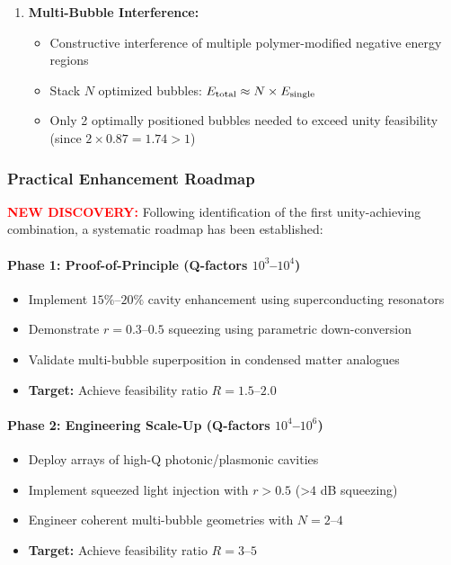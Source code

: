 \documentclass[11pt]{article}
\begin{document}
{\begin{enumerate}
  \item \textbf{Multi-Bubble Interference:}
        \begin{itemize}
          \item Constructive interference of multiple polymer-modified negative energy regions
          \item Stack $N$ optimized bubbles: $E_{\rm total} \approx N \times E_{\rm single}$
          \item Only 2 optimally positioned bubbles needed to exceed unity feasibility (since $2 \times 0.87 = 1.74 > 1$)
        \end{itemize}
\end{enumerate}

\subsubsection*{Practical Enhancement Roadmap}
\textcolor{red}{\textbf{NEW DISCOVERY:}} Following identification of the first unity-achieving combination, a systematic roadmap has been established:

\paragraph{Phase 1: Proof-of-Principle (Q-factors $10^3$--$10^4$)}
\begin{itemize}
  \item Implement $15\%$--$20\%$ cavity enhancement using superconducting resonators
  \item Demonstrate $r = 0.3$--$0.5$ squeezing using parametric down-conversion
  \item Validate multi-bubble superposition in condensed matter analogues
  \item \textbf{Target:} Achieve feasibility ratio $R = 1.5$--$2.0$
\end{itemize}

\paragraph{Phase 2: Engineering Scale-Up (Q-factors $10^4$--$10^6$)}
\begin{itemize}
  \item Deploy arrays of high-Q photonic/plasmonic cavities
  \item Implement squeezed light injection with $r > 0.5$ (>$4$ dB squeezing)
  \item Engineer coherent multi-bubble geometries with $N = 2$--$4$
  \item \textbf{Target:} Achieve feasibility ratio $R = 3$--$5$
\end{itemize}

}
\end{document}
